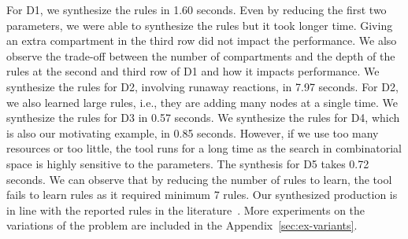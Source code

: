 For D1, we synthesize the rules in 1.60 seconds. Even by reducing the first two parameters, we were able to synthesize the rules but it took longer time.
Giving an extra compartment in the third row did not impact the performance.  We also observe the trade-off between the number of compartments
and the depth of the rules at the second and third row of D1 and how it impacts performance.
We synthesize the rules for D2, involving runaway reactions,  in 7.97 seconds.
For D2, we also learned large rules, i.e., they are adding many nodes at a single time.
We synthesize the rules for D3 in 0.57 seconds. We synthesize the rules for D4, which is also our motivating example, in 0.85 seconds.
However, if we use too many resources or too little, the tool runs for a long time as the search in combinatorial space is highly sensitive to the parameters.
The synthesis for D5 takes 0.72 seconds. We can observe that by reducing the number of rules to learn, the tool fails to learn rules as it required minimum 7 rules.
Our synthesized production is in line with the reported rules
in the literature~\cite{Jaiman2018}.
More experiments on the variations of the problem
are included in the Appendix~\ref{sec:ex-variants}. %









